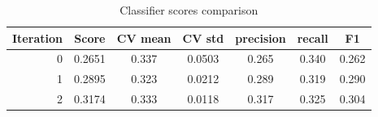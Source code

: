 \documentclass[11pt]{article}
\begin{document}
\begin{table}[htb]
\begin{center}
\begin{tabular}{ |r|c|c|c|c|c|c| }
\hline
Iteration 	& Score  & CV mean & CV std & precision & recall & F1 \\ \hline
0			& 0.2651 & 0.337   & 0.0503 & 0.265 	& 0.340  & 0.262 \\ \hline
1			& 0.2895 & 0.323   & 0.0212 & 0.289 	& 0.319  & 0.290 \\ \hline
2 			& 0.3174 & 0.333   & 0.0118 & 0.317 	& 0.325  & 0.304 \\ \hline
\end{tabular}
\caption{Classifier scores comparison}
\end{center}
\end{table}
\FloatBarrier
\end{document}
